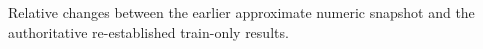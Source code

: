 Relative changes between the earlier approximate numeric snapshot and the authoritative re-established train-only results.
